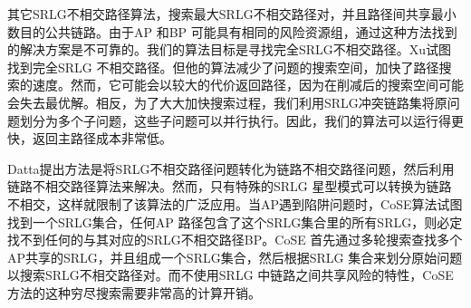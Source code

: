 其它SRLG不相交路径算法\cite{rostami2012msdp,rostami2007cose,datta2008graph,xu2003new,todimala2004imsh}，搜索最大SRLG不相交路径对，并且路径间共享最小数目的公共链路。由于AP 和BP 可能具有相同的风险资源组，通过这种方法找到的解决方案是不可靠的。我们的算法目标是寻找完全SRLG不相交路径。Xu\cite{xu2003trap}试图找到完全SRLG 不相交路径。但他的算法减少了问题的搜索空间，加快了路径搜索的速度。然而，它可能会以较大的代价返回路径，因为在削减后的搜索空间可能会失去最优解。相反，为了大大加快搜索过程，我们利用SRLG冲突链路集将原问题划分为多个子问题，这些子问题可以并行执行。因此，我们的算法可以运行得更快，返回主路径成本非常低。

Datta\cite{datta2008graph}提出方法是将SRLG不相交路径问题转化为链路不相交路径问题，然后利用链路不相交路径算法来解决。然而，只有特殊的SRLG 星型模式可以转换为链路不相交，这样就限制了该算法的广泛应用。当AP遇到陷阱问题时，CoSE\cite{rostami2007cose}算法试图找到一个SRLG集合，任何AP 路径包含了这个SRLG集合里的所有SRLG，则必定找不到任何的与其对应的SRLG不相交路径BP。CoSE 首先通过多轮搜索查找多个AP共享的SRLG，并且组成一个SRLG集合，然后根据SRLG 集合来划分原始问题以搜索SRLG不相交路径对。而不使用SRLG 中链路之间共享风险的特性，CoSE方法的这种穷尽搜索需要非常高的计算开销。



